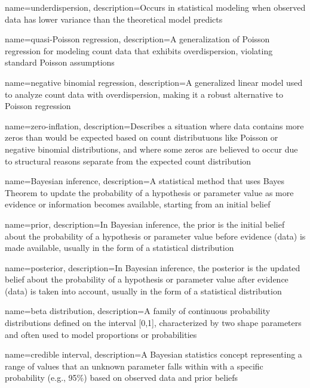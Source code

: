 {
    name={underdispersion},
    description={Occurs in statistical modeling when observed data has lower variance than the theoretical model predicts}
}

{
    name={quasi-Poisson regression},
    description={A generalization of Poisson regression for modeling count data that exhibits overdispersion, violating standard Poisson assumptions}
}

{
    name={negative binomial regression},
    description={A generalized linear model used to analyze count data with overdispersion, making it a robust alternative to Poisson regression}
}

{
    name={zero-inflation},
    description={Describes a situation where data contains more zeros than would be expected based on count distributuons like Poisson or negative binomial distributions, and where some zeros are believed to occur due to structural
    reasons separate from the expected count distribution}
}

{
    name={Bayesian inference},
    description={A statistical method that uses Bayes Theorem to update the probability of a hypothesis or parameter value as more evidence or information becomes available, starting from an initial belief}
}

{
    name={prior},
    description={In Bayesian inference, the prior is the initial belief about the probability of a hypothesis or parameter value before evidence (data) is made available, usually in the form of a statistical distribution}
}

{
    name={posterior},
    description={In Bayesian inference, the posterior is the updated belief about the probability of a hypothesis or parameter value after evidence (data) is taken into account, usually in the form of a statistical distribution}
}

{
    name={beta distribution},
    description={A family of continuous probability distributions defined on the interval [0,1], characterized by two shape parameters and often used to model proportions or probabilities}
}

{
    name={credible interval},
    description={A Bayesian statistics concept representing a range of values that an unknown parameter falls within with a specific probability (e.g., 95\%) based on observed data and prior beliefs}
}

